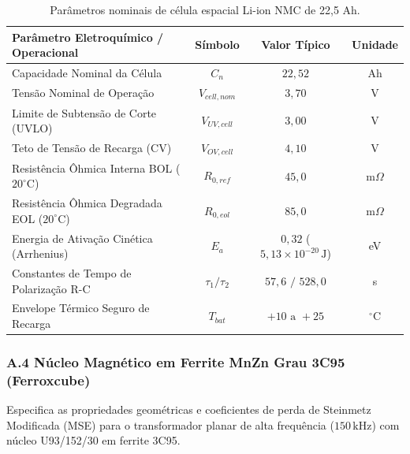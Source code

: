 \begin{table}[!ht]
\centering
\small
\renewcommand{\arraystretch}{0.85}
\caption{Parâmetros nominais de célula espacial Li-ion NMC de 22,5 Ah.}
\label{tab:anexo_bateria_nmc}
\begin{tabular}{lccc}
\hline
\textbf{Parâmetro Eletroquímico / Operacional} & \textbf{Símbolo} & \textbf{Valor Típico} & \textbf{Unidade} \\ \hline
Capacidade Nominal da Célula & $C_n$ & $22{,}52$ & Ah \\
Tensão Nominal de Operação & $V_{cell,nom}$ & $3{,}70$ & V \\
Limite de Subtensão de Corte (UVLO) & $V_{UV,cell}$ & $3{,}00$ & V \\
Teto de Tensão de Recarga (CV) & $V_{OV,cell}$ & $4{,}10$ & V \\
Resistência Ôhmica Interna BOL ($20^\circ\text{C}$) & $R_{0,ref}$ & $45{,}0$ & m$\Omega$ \\
Resistência Ôhmica Degradada EOL ($20^\circ\text{C}$) & $R_{0,eol}$ & $85{,}0$ & m$\Omega$ \\
Energia de Ativação Cinética (Arrhenius) & $E_a$ & $0{,}32$ ($5{,}13 \times 10^{-20}\,\mathrm{J}$) & eV \\
Constantes de Tempo de Polarização R-C & $\tau_1 / \tau_2$ & $57{,}6\text{ / }528{,}0$ & s \\
Envelope Térmico Seguro de Recarga & $T_{bat}$ & $+10\text{ a }+25$ & $^\circ\text{C}$ \\ \hline
\end{tabular}
\end{table}

\subsubsection*{A.4 Núcleo Magnético em Ferrite MnZn Grau 3C95 (Ferroxcube)}
Especifica as propriedades geométricas e coeficientes de perda de Steinmetz Modificada (MSE) para o transformador planar de alta frequência ($150\,\mathrm{kHz}$) com núcleo U93/152/30 em ferrite 3C95.

